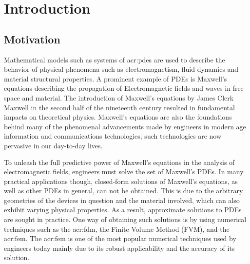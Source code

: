 \graphicspath{{./figs/Chp-Intro/}}

\chapter{Introduction}
\label{chp:intro}

\section{Motivation}
Mathematical models such as systems of \glspl{acr:pde} are used to describe the behavior of physical phenomena such as electromagnetism, fluid dynamics and material structural properties.
A prominent example of PDEs is Maxwell's equations describing the propagation of Electromagnetic fields and waves in free space and material.
The introduction of Maxwell's equations by James Clerk Maxwell in the second half of the nineteenth century \cite{bib:Jin2002TFEMIE} resulted in fundamental impacts on theoretical physics.
Maxwell's equations are also the foundations behind many of the phenomenal advancements made by engineers in modern age information and communications technologies; such technologies are now pervasive in our day-to-day lives.


To unleash the full predictive power of Maxwell's equations in the analysis of electromagnetic fields, engineers must solve the set of Maxwell's PDEs.
In many practical applications though, closed-form solutions of Maxwell's equations, as well as other PDEs in general, can not be obtained. 
This is due to the arbitrary geometries of the devices in question and the material involved, which can also exhibit varying physical properties.
As a result, approximate solutions to PDEs are sought in practice.
One way of obtaining such solutions is by using numerical techniques such as the \gls{acr:fdm}, the Finite Volume Method (FVM), and the \gls{acr:fem}.
The \gls{acr:fem} is one of the most popular numerical techniques used by engineers today mainly due to its robust applicability and the accuracy of its solution.


